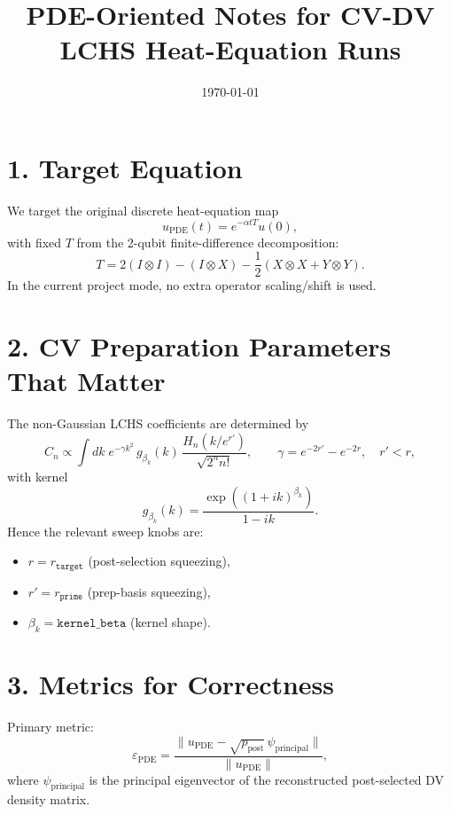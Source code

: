 \documentclass[11pt]{article}
\title{PDE-Oriented Notes for CV-DV LCHS Heat-Equation Runs}
\date{\today}
\begin{document}
\maketitle

\section*{1. Target Equation}
We target the original discrete heat-equation map
\begin{equation}
u_{\mathrm{PDE}}(t)=e^{-\alpha t T}u(0),
\end{equation}
with fixed $T$ from the 2-qubit finite-difference decomposition:
\begin{equation}
T = 2(I\otimes I) - (I\otimes X) - \frac{1}{2}(X\otimes X + Y\otimes Y).
\end{equation}
In the current project mode, no extra operator scaling/shift is used.

\section*{2. CV Preparation Parameters That Matter}
The non-Gaussian LCHS coefficients are determined by
\begin{equation}
C_n \propto \int dk\;
e^{-\gamma k^2}\,g_{\beta_k}(k)\,
\frac{H_n(k/e^{r'})}{\sqrt{2^n n!}},
\qquad
\gamma=e^{-2r'}-e^{-2r},\quad r'<r,
\end{equation}
with kernel
\begin{equation}
g_{\beta_k}(k)=\frac{\exp((1+ik)^{\beta_k})}{1-ik}.
\end{equation}
Hence the relevant sweep knobs are:
\begin{itemize}
\item $r=r_{\texttt{target}}$ (post-selection squeezing),
\item $r'=r_{\texttt{prime}}$ (prep-basis squeezing),
\item $\beta_k=\texttt{kernel\_beta}$ (kernel shape).
\end{itemize}

\section*{3. Metrics for Correctness}
Primary metric:
\begin{equation}
\varepsilon_{\mathrm{PDE}}
=\frac{\|u_{\mathrm{PDE}}-\sqrt{p_{\mathrm{post}}}\,\psi_{\mathrm{principal}}\|}{\|u_{\mathrm{PDE}}\|},
\end{equation}
where $\psi_{\mathrm{principal}}$ is the principal eigenvector of the reconstructed post-selected DV density matrix.
\end{document}
